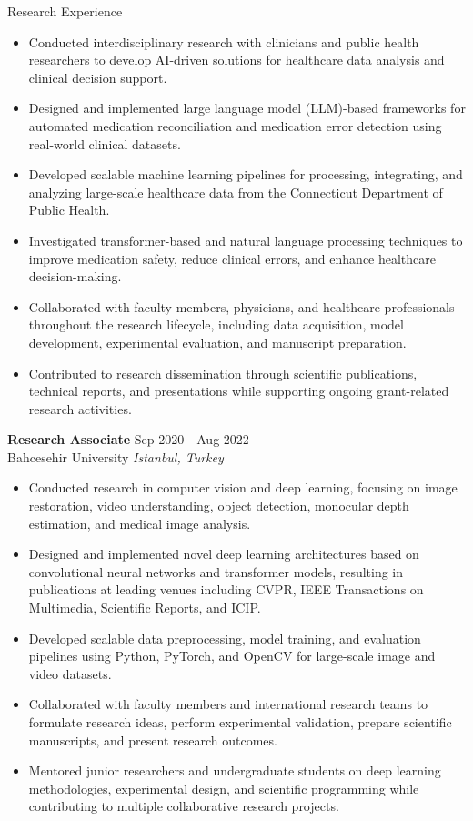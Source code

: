 \begin{rSection}{Research Experience}
\begin{itemize}
    \itemsep -3pt {}
    \item Conducted interdisciplinary research with clinicians and public health researchers to develop AI-driven solutions for healthcare data analysis and clinical decision support.
    \item Designed and implemented large language model (LLM)-based frameworks for automated medication reconciliation and medication error detection using real-world clinical datasets.
    \item Developed scalable machine learning pipelines for processing, integrating, and analyzing large-scale healthcare data from the Connecticut Department of Public Health.
    \item Investigated transformer-based and natural language processing techniques to improve medication safety, reduce clinical errors, and enhance healthcare decision-making.
    \item Collaborated with faculty members, physicians, and healthcare professionals throughout the research lifecycle, including data acquisition, model development, experimental evaluation, and manuscript preparation.
    \item Contributed to research dissemination through scientific publications, technical reports, and presentations while supporting ongoing grant-related research activities.
\end{itemize}

{\bf Research Associate} \hfill { Sep 2020 - Aug 2022}
\\ 
Bahcesehir University \hfill \textit{Istanbul, Turkey}

 \begin{itemize}
    \itemsep -3pt {} 
     \item Conducted research in computer vision and deep learning, focusing on image restoration, video understanding, object detection, monocular depth estimation, and medical image analysis.
     \item Designed and implemented novel deep learning architectures based on convolutional neural networks and transformer models, resulting in publications at leading venues including CVPR, IEEE Transactions on Multimedia, Scientific Reports, and ICIP.
     \item Developed scalable data preprocessing, model training, and evaluation pipelines using Python, PyTorch, and OpenCV for large-scale image and video datasets.
     \item Collaborated with faculty members and international research teams to formulate research ideas, perform experimental validation, prepare scientific manuscripts, and present research outcomes.
     \item Mentored junior researchers and undergraduate students on deep learning methodologies, experimental design, and scientific programming while contributing to multiple collaborative research projects.
 \end{itemize}


\end{rSection}
